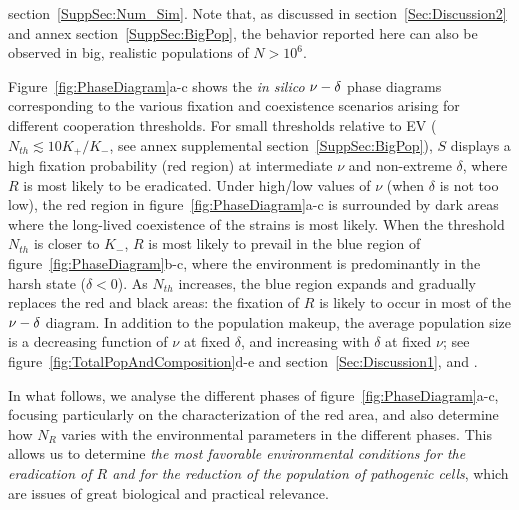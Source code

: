\documentclass{article}
\begin{document}
section~\ref{SuppSec:Num_Sim}. Note that, as discussed in section~\ref{Sec:Discussion2} and annex section~\ref{SuppSec:BigPop}, the behavior reported here can also be observed in big, realistic populations of \(N>10^{6}\).

Figure~\ref{fig:PhaseDiagram}a-c shows the {\it in silico} $\nu \--\delta$ phase diagrams corresponding to the various fixation and coexistence scenarios arising for different cooperation thresholds. For small thresholds relative to EV (\(N_{th}\lesssim10K_{+}/K_{-}\), see annex supplemental section~\ref{SuppSec:BigPop}), $S$ displays a high fixation probability (red region) at intermediate \(\nu\) and non-extreme \(\delta\), where $R$ is most likely to be eradicated. Under high/low values of $\nu$ (when $\delta$ is not too low), the red region in figure~\ref{fig:PhaseDiagram}a-c is surrounded by dark areas where the long-lived coexistence of the strains is most likely. When the threshold \(N_{th}\) is closer to \(K_{-}\), $R$ is most likely to prevail in the blue region of figure~\ref{fig:PhaseDiagram}b-c, where the environment is predominantly in the harsh state ($\delta<0$). As \(N_{th}\) increases, the blue region expands and gradually replaces the red and black areas: the fixation of $R$ is likely to occur in  most of the  $\nu \--\delta$ diagram. In addition to the population makeup, the average population size is a decreasing function of $\nu$ at fixed $\delta$, and increasing with \(\delta\) at fixed \(\nu\); see figure~\ref{fig:TotalPopAndComposition}d-e and section~\ref{Sec:Discussion1}, and \cite{wienand2017evolution,wienand2018eco,taitelbaum2020population,Shibasaki2021,taitelbaum2023evolutionary}.

In what follows, we  analyse the different phases of figure~\ref{fig:PhaseDiagram}a-c, focusing particularly on the characterization of the red area, and also determine how $N_R$ varies with the environmental parameters in the different phases. This allows us to determine \emph{the most favorable environmental conditions  for the eradication of $R$ and for the reduction of the population of pathogenic cells}, which are issues of great biological and practical relevance.
\end{document}
